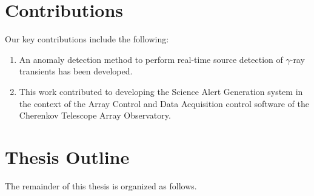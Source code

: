 

\section{Contributions}
\label{s:Contributions}

Our key contributions include the following:

\begin{enumerate}

  \item An anomaly detection method to perform real-time source detection of $\gamma$-ray transients has been developed.
  
  \item This work contributed to developing the Science Alert Generation system in the context of the Array Control and Data Acquisition control software of the Cherenkov Telescope Array Observatory.

\end{enumerate}

\section{Thesis Outline}
\label{s:Outline}

The remainder of this thesis is organized as follows. 

